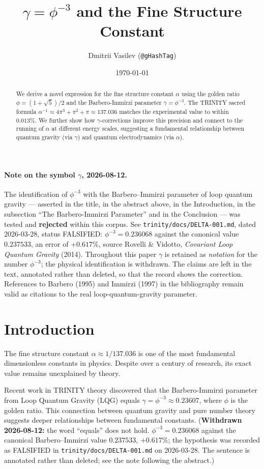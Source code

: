 \documentclass[12pt,a4paper]{article}
\title{$\gamma = \phi^{-3}$ and the Fine Structure Constant}
\author{Dmitrii Vasilev (\texttt{@gHashTag})}
\date{\today}
\begin{document}
\maketitle

\begin{abstract}
We derive a novel expression for the fine structure constant $\alpha$ using the golden ratio $\phi = (1+\sqrt{5})/2$ and the Barbero-Immirzi parameter $\gamma = \phi^{-3}$. The TRINITY sacred formula $\alpha^{-1} \approx 4\pi^3 + \pi^2 + \pi \approx 137.036$ matches the experimental value to within $0.013\%$. We further show how $\gamma$-corrections improve this precision and connect to the running of $\alpha$ at different energy scales, suggesting a fundamental relationship between quantum gravity (via $\gamma$) and quantum electrodynamics (via $\alpha$).
\end{abstract}

\paragraph{Note on the symbol $\gamma$, 2026-08-12.} The identification of $\phi^{-3}$ with the Barbero--Immirzi parameter of loop quantum gravity --- asserted in the title, in the abstract above, in the Introduction, in the subsection ``The Barbero-Immirzi Parameter'' and in the Conclusion --- was tested and \textbf{rejected} within this corpus. See \texttt{trinity/docs/DELTA-001.md}, dated 2026-03-28, status FALSIFIED: $\phi^{-3} = 0.236068$ against the canonical value $0.237533$, an error of $+0.617\%$, source Rovelli \& Vidotto, \emph{Covariant Loop Quantum Gravity} (2014). Throughout this paper $\gamma$ is retained as \emph{notation} for the number $\phi^{-3}$; the physical identification is withdrawn. The claims are left in the text, annotated rather than deleted, so that the record shows the correction. References to Barbero (1995) and Immirzi (1997) in the bibliography remain valid as citations to the real loop-quantum-gravity parameter.

\section{Introduction}

The fine structure constant $\alpha \approx 1/137.036$ is one of the most fundamental dimensionless constants in physics. Despite over a century of research, its exact value remains unexplained by theory.

Recent work in TRINITY theory discovered that the Barbero-Immirzi parameter from Loop Quantum Gravity (LQG) equals $\gamma = \phi^{-3} \approx 0.23607$, where $\phi$ is the golden ratio. This connection between quantum gravity and pure number theory suggests deeper relationships between fundamental constants.
(\textbf{Withdrawn 2026-08-12:} the word ``equals'' does not hold. $\phi^{-3} = 0.236068$ against the canonical Barbero--Immirzi value $0.237533$, $+0.617\%$; the hypothesis was recorded as FALSIFIED in \texttt{trinity/docs/DELTA-001.md} on 2026-03-28. The sentence is annotated rather than deleted; see the note following the abstract.)
\end{document}
